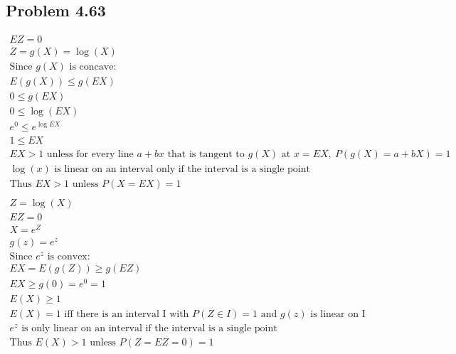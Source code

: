 \documentclass{article}
\begin{document}
\begin{flushleft}
\section*{Problem 4.63}
\begin{multline*}
EZ=0\\
Z=g(X)=\log(X)\\
\text{Since } g(X) \text{ is concave:}\\
E(g(X))\leq g(EX)\\
0\leq g(EX)\\
0\leq \log(EX)\\
e^0\leq e^{\log{EX}}\\
1\leq EX\\
EX > 1 \text{ unless for every line } a+bx \text{ that is tangent to } g(X) \text{ at } x=EX, \ P(g(X)=a+bX)=1\\
\log(x) \text{ is linear on an interval only if the interval is a single point}\\ 
\text{Thus } EX>1 \text{ unless } P(X=EX)=1\\
\end{multline*}
\begin{multline*}
Z=\log(X)\\
EZ=0\\
X=e^Z\\
g(z)=e^z\\
\text{Since } e^z \text{ is convex}:\\
EX=E(g(Z))\geq g(EZ)\\
EX\geq g(0)=e^0=1\\
E(X)\geq 1\\
E(X)=1 \text{ iff there is an interval I with } P(Z\in I)=1 \text{ and } g(z) \text{ is linear on I}\\
e^z \text{ is only linear on an interval if the interval is a single point}\\
\text{Thus } E(X)>1 \text{ unless } P(Z=EZ=0)=1\\
\end{multline*}

\end{flushleft}
\end{document}
